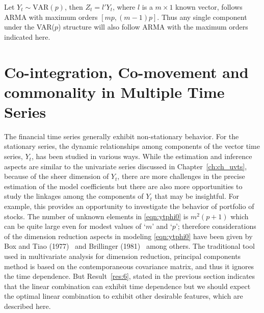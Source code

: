 \begin{result} \label{res:6} 
Let $Y_t \sim \text{VAR}(p)$, then $Z_t= l' Y_t$, where $l$ is a $m \times 1$ known vector, follows ARMA with maximum orders $[mp, (m-1)p]$. Thus any single component under the VAR($p$) structure will also follow ARMA with the maximum orders indicated here.
\end{result}



\section{Co-integration, Co-movement and commonality in Multiple Time Series \label{sec:comts}}


The financial time series generally exhibit non-stationary behavior. For the stationary series, the dynamic relationships among components of the vector time series, $Y_t$, has been studied in various ways. While the estimation and inference aspects are similar to the univariate series discussed in Chapter~\ref{ch:ch_uvts}, because of the sheer dimension of $Y_t$, there are more challenges in the precise estimation of the model coefficients but there are also more opportunities to study the linkages among the components of $Y_t$ that may be insightful. For example, this provides an opportunity to investigate the behavior of portfolio of stocks. The number of unknown elements in \eqref{eqn:ytphi0} is $m^2 (p+1)$ which can be quite large even for modest values of `$m$' and `$p$'; therefore considerations of the dimension reduction aspects in modeling \eqref{eqn:ytphi0} have been given by Box and Tiao (1977)~\cite{box77} and Brillinger (1981)~\cite{brill81} among others. The traditional tool used in multivariate analysis for dimension reduction, principal components method is based on the contemporaneous covariance matrix, and thus it ignores the time dependence. But Result~\ref{res:6}, stated in the previous section indicates that the linear combination can exhibit time dependence but we should expect the optimal linear combination to exhibit other desirable features, which are described here. 


